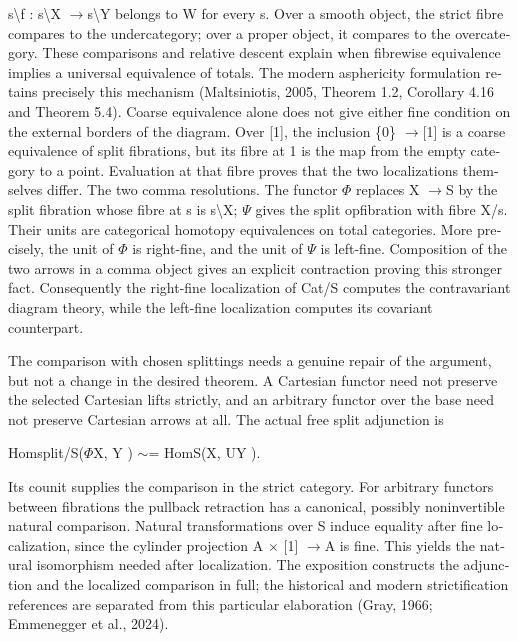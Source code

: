 \begin{otherlanguage}{english}
s\textbackslash{}f : s\textbackslash{}X \ensuremath{\to}s\textbackslash{}Y belongs to W for every s. Over a smooth object, the strict fibre compares to the undercategory; over a proper object, it compares to the overcategory. These comparisons and relative descent explain when fibrewise equivalence implies a universal equivalence of totals. The modern asphericity formulation retains precisely this mechanism (Maltsiniotis, 2005, Theorem 1.2, Corollary 4.16 and Theorem 5.4). Coarse equivalence alone does not give either fine condition on the external borders of the diagram. Over [1], the inclusion \{0\} \ensuremath{\to}[1] is a coarse equivalence of split fibrations, but its fibre at 1 is the map from the empty category to a point. Evaluation at that fibre proves that the two localizations themselves differ. The two comma resolutions. The functor \ensuremath{\Phi} replaces X \ensuremath{\to}S by the split fibration whose fibre at s is s\textbackslash{}X; \ensuremath{\Psi} gives the split opfibration with fibre X/s. Their units are categorical homotopy equivalences on total categories. More precisely, the unit of \ensuremath{\Phi} is right-fine, and the unit of \ensuremath{\Psi} is left-fine. Composition of the two arrows in a comma object gives an explicit contraction proving this stronger fact. Consequently the right-fine localization of Cat/S computes the contravariant diagram theory, while the left-fine localization computes its covariant counterpart.


The comparison with chosen splittings needs a genuine repair of the argument, but not a change in the desired theorem. A Cartesian functor need not preserve the selected Cartesian lifts strictly, and an arbitrary functor over the base need not preserve Cartesian arrows at all. The actual free split adjunction is


Homsplit/S(\ensuremath{\Phi}X, Y ) \ensuremath{\sim}= HomS(X, UY ).


Its counit supplies the comparison in the strict category. For arbitrary functors between fibrations the pullback retraction has a canonical, possibly noninvertible natural comparison. Natural transformations over S induce equality after fine localization, since the cylinder projection A \ensuremath{\times} [1] \ensuremath{\to}A is fine. This yields the natural isomorphism needed after localization. The exposition constructs the adjunction and the localized comparison in full; the historical and modern strictification references are separated from this particular elaboration (Gray, 1966; Emmenegger et al., 2024).



\end{otherlanguage}
